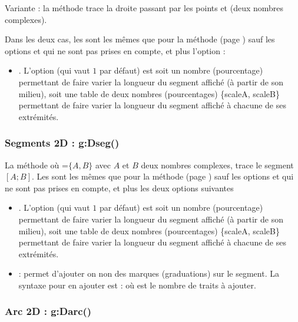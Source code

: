Variante : la méthode  trace la droite passant par les points  et  (deux nombres complexes). 

Dans les deux cas, les  sont les mêmes que pour la méthode  (page \pageref{dec:dpolyline}) sauf les options  et  qui ne sont pas prises en compte, et plus l'option :
\begin{itemize}
    \item {}.  L'option  (qui vaut $1$ par défaut) est soit un nombre (pourcentage) permettant de faire varier la longueur du segment affiché (à partir de son milieu), soit une table de deux nombres (pourcentages) \{scaleA, scaleB\} permettant de faire varier la longueur du segment affiché à chacune de ses extrémités.
\end{itemize}

\subsubsection{Segments 2D : g:Dseg()}

La méthode  où =$\{A,B\}$ avec $A$ et $B$ deux nombres complexes, trace le segment $[A;B]$. Les  sont les mêmes que pour la méthode  (page \pageref{dec:dpolyline}) sauf les options  et  qui ne sont pas prises en compte, et plus les deux options suivantes
\begin{itemize}
    \item {}. L'option  (qui vaut $1$ par défaut) est soit un nombre (pourcentage) permettant de faire varier la longueur du segment affiché (à partir de son milieu), soit une table de deux nombres (pourcentages) \{scaleA, scaleB\} permettant de faire varier la longueur du segment affiché à chacune de ses extrémités.
    
    \item {} : permet d'ajouter on non des marques (graduations) sur le segment. La syntaxe pour en ajouter est :  où  est le nombre de traits à ajouter.
\end{itemize}

\subsubsection{Arc 2D : g:Darc()}

